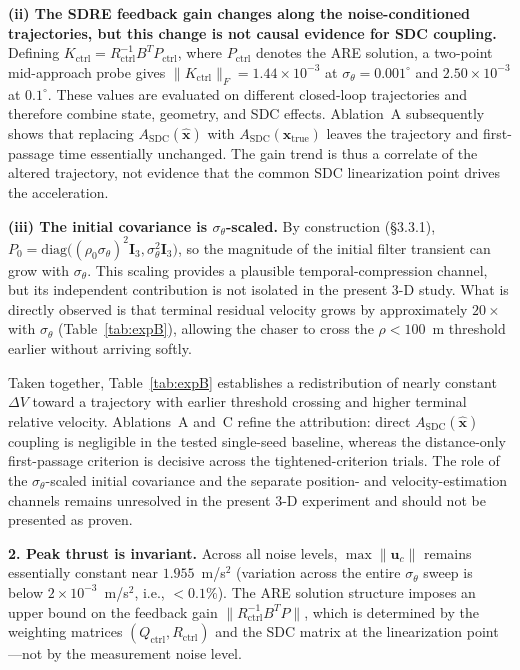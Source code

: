 \documentclass[preprint,3p,times]{elsarticle}
\begin{document}
\textbf{(ii) The SDRE feedback gain changes along the noise-conditioned trajectories, but this change is not causal evidence for SDC coupling.} Defining $K_{\text{ctrl}} = R_{\text{ctrl}}^{-1}B^T P_{\text{ctrl}}$, where $P_{\text{ctrl}}$ denotes the ARE solution, a two-point mid-approach probe gives $\|K_{\text{ctrl}}\|_F = 1.44 \times 10^{-3}$ at $\sigma_\theta = 0.001^\circ$ and $2.50 \times 10^{-3}$ at $0.1^\circ$. These values are evaluated on different closed-loop trajectories and therefore combine state, geometry, and SDC effects. Ablation~A subsequently shows that replacing $A_{\text{SDC}}(\hat{\mathbf{x}})$ with $A_{\text{SDC}}(\mathbf{x}_{\text{true}})$ leaves the trajectory and first-passage time essentially unchanged. The gain trend is thus a correlate of the altered trajectory, not evidence that the common SDC linearization point drives the acceleration.

\textbf{(iii) The initial covariance is $\sigma_\theta$-scaled.} By construction (§3.3.1), $P_0 = \text{diag}\big((\rho_0 \sigma_\theta)^2 \mathbf{I}_3, \sigma_\theta^2 \mathbf{I}_3\big)$, so the magnitude of the initial filter transient can grow with $\sigma_\theta$. This scaling provides a plausible temporal-compression channel, but its independent contribution is not isolated in the present 3-D study. What is directly observed is that terminal residual velocity grows by approximately $20\times$ with $\sigma_\theta$ (Table~\ref{tab:expB}), allowing the chaser to cross the $\rho < 100$~m threshold earlier without arriving softly.

Taken together, Table~\ref{tab:expB} establishes a redistribution of nearly constant $\Delta V$ toward a trajectory with earlier threshold crossing and higher terminal relative velocity. Ablations~A and~C refine the attribution: direct $A_{\text{SDC}}(\hat{\mathbf{x}})$ coupling is negligible in the tested single-seed baseline, whereas the distance-only first-passage criterion is decisive across the tightened-criterion trials. The role of the $\sigma_\theta$-scaled initial covariance and the separate position- and velocity-estimation channels remains unresolved in the present 3-D experiment and should not be presented as proven.

\textbf{2. Peak thrust is invariant.} Across all noise levels, $\max \|\mathbf{u}_c\|$ remains essentially constant near $1.955$~m/s$^2$ (variation across the entire $\sigma_\theta$ sweep is below $2 \times 10^{-3}$~m/s$^2$, i.e., ${<}0.1\%$). The ARE solution structure imposes an upper bound on the feedback gain $\|R_{\text{ctrl}}^{-1} B^T P\|$, which is determined by the weighting matrices $(Q_{\text{ctrl}}, R_{\text{ctrl}})$ and the SDC matrix at the linearization point---not by the measurement noise level.
\end{document}
